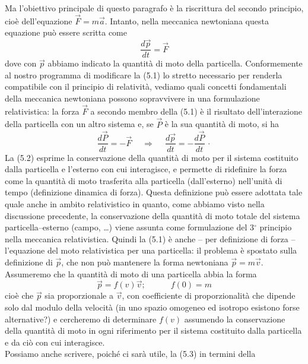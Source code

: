 Ma l'obiettivo principale di questo paragrafo \`e la riscrittura del secondo
principio, cio\`e dell'equazione $\vec F=m\vec a$. Intanto, nella meccanica
newtoniana questa equazione pu\`o essere scritta come
\begin{equation}
  \frac{d\vec p}{dt}=\vec F
  \tag{5.1}
\end{equation}
dove con $\vec p$ abbiamo indicato la quantit\`a di moto della particella.
Conformemente al nostro programma di modificare la (5.1) lo stretto necessario
per renderla compatibile con il principio di relativit\`a, vediamo quali
concetti fondamentali della meccanica newtoniana possono sopravvivere in una
formulazione relativistica: la forza $\vec F$ a secondo membro della (5.1) \`e
il risultato dell'interazione della particella con un altro sistema e, se
$\vec P$ \`e la sua quantit\`a di moto, si ha
\begin{equation}
  \frac{d\vec P}{dt}=-\vec F
  \quad\ \Rightarrow\quad\ \frac{d\vec p}{dt}=-\frac{d\vec P}{dt}\,\cdot
  \tag{5.2}
\end{equation}
La (5.2) esprime la conservazione della quantit\`a di moto per il sistema
costituito dalla particella e l'esterno con cui interagisce, e permette di
ridefinire la forza come la quantit\`a di moto trasferita alla particella
(dall'esterno) nell'unit\`a di tempo (definizione dinamica di forza). Questa
definizione pu\`o essere adottata tale quale anche in ambito relativistico in
quanto, come abbiamo visto nella discussione precedente, la conservazione della
quantit\`a di moto totale del sistema particella--esterno (campo, \dots) viene
assunta come formulazione del 3$^\circ$ principio nella meccanica relativistica.
Quindi la (5.1) \`e anche -- per definizione di forza -- l'equazione del moto
relativistica per una particella: il problema \`e spostato sulla definizione di
$\vec p$, che non pu\`o mantenere la forma newtoniana $\vec p=m\vec v$.
Assumeremo che la quantit\`a di moto di una particella abbia la forma
\begin{equation}
  \vec p=f(v)\vec v;\qquad\quad f(0)=m
  \tag{5.3}
\end{equation}
cio\`e che $\vec p$ sia proporzionale a $\vec v$, con coefficiente di
proporzionalit\`a che dipende solo dal modulo della velocit\`a (in uno spazio
omogeneo ed isotropo esistono forse alternative?) e cercheremo di determinare
$f(v)$ assumendo la conservazione della quantit\`a di moto in ogni riferimento
per il sistema costituito dalla particella e da ci\`o con cui interagisce.\\
Possiamo anche scrivere, poich\'e ci sar\`a utile, la (5.3) in termini della
